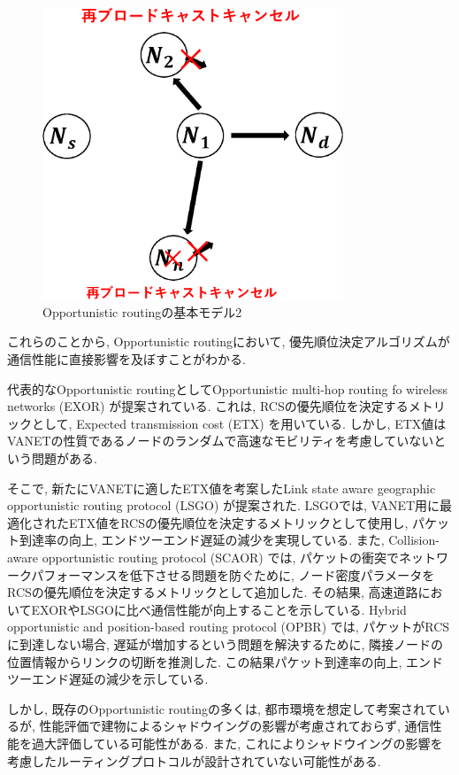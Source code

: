 \documentclass[10pt]{jreport}
\begin{document}
\begin{figure}[!ht]
	\centering
	\includegraphics[width=90mm]{figures/basic-opportunity2.eps}
	\caption{Opportunistic routingの基本モデル2}
	\label{fig:Basic2}
\end{figure}

これらのことから, Opportunistic routingにおいて, 優先順位決定アルゴリズムが通信性能に直接影響を及ぼすことがわかる.

代表的なOpportunistic routingとしてOpportunistic multi-hop routing fo wireless networks (EXOR) \cite{16}が提案されている. これは, RCSの優先順位を決定するメトリックとして, Expected transmission cost (ETX) \cite{21}を用いている. しかし, ETX値はVANETの性質であるノードのランダムで高速なモビリティを考慮していないという問題がある.

そこで, 新たにVANETに適したETX値を考案したLink state aware geographic opportunistic routing protocol (LSGO) \cite{18}が提案された. LSGOでは, VANET用に最適化されたETX値をRCSの優先順位を決定するメトリックとして使用し, パケット到達率の向上, エンドツーエンド遅延の減少を実現している. また, Collision-aware opportunistic routing protocol (SCAOR) \cite{22}では, パケットの衝突でネットワークパフォーマンスを低下させる問題を防ぐために, ノード密度パラメータをRCSの優先順位を決定するメトリックとして追加した. その結果, 高速道路においてEXORやLSGOに比べ通信性能が向上することを示している. Hybrid opportunistic and position-based routing  protocol (OPBR) \cite{23}では, パケットがRCSに到達しない場合, 遅延が増加するという問題を解決するために, 隣接ノードの位置情報からリンクの切断を推測した. この結果パケット到達率の向上, エンドツーエンド遅延の減少を示している.

しかし, 既存のOpportunistic routingの多くは, 都市環境を想定して考案されているが, 性能評価で建物によるシャドウイングの影響が考慮されておらず, 通信性能を過大評価している可能性がある. また, これによりシャドウイングの影響を考慮したルーティングプロトコルが設計されていない可能性がある. 
\end{document}

